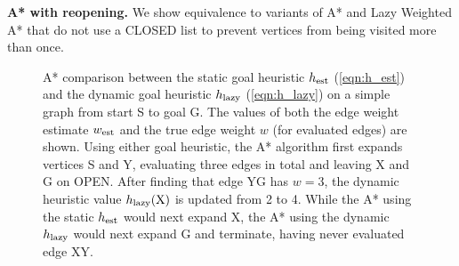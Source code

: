 \textbf{A* with reopening.}
We show equivalence to variants of A* and Lazy Weighted A*
that do not use a CLOSED list to prevent
vertices from being visited more than once.

\begin{figure}
   \centering
   \caption{A* comparison between
      the static goal heuristic $h_{\mbox{\scriptsize est}}$ (\ref{eqn:h_est})
      and the dynamic goal heuristic $h_{\mbox{\scriptsize lazy}}$ (\ref{eqn:h_lazy})
      on a simple graph from start S to goal G.
      The values of both the edge weight estimate $w_{\mbox{\scriptsize est}}$
      and the true edge weight $w$ (for evaluated edges) are shown.
      Using either goal heuristic,
      the A* algorithm first expands vertices S and Y,
      evaluating three edges in total and leaving X and G on OPEN.
      After finding that edge YG has $w=3$,
      the dynamic heuristic value $h_{\mbox{\scriptsize lazy}}(\mbox{X})$
      is updated from 2 to 4.
      While the A* using the static $h_{\mbox{\scriptsize est}}$ would next expand X,
      the A* using the dynamic $h_{\mbox{\scriptsize lazy}}$ would next expand G
      and terminate, having never evaluated edge XY.}
   \label{fig:updating-heuristic}
\end{figure}

